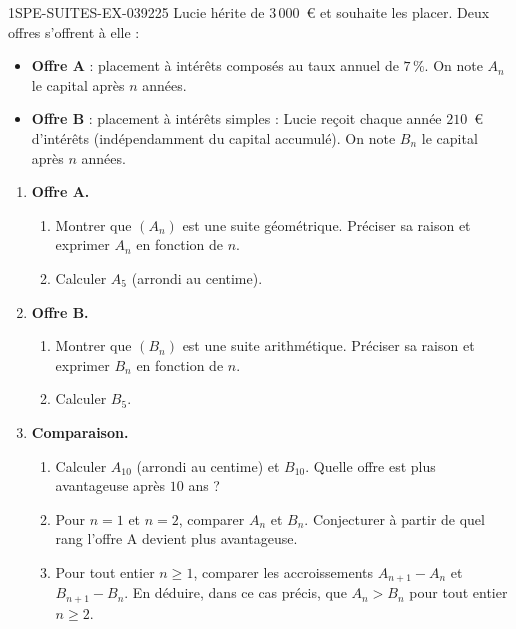 \begin{exercice}{1SPE-SUITES-EX-039}{2}{25}
Lucie hérite de $3\,000$~\euro{} et souhaite les placer. Deux offres s'offrent à elle :

\begin{itemize}
  \item \textbf{Offre A} : placement à intérêts composés au taux annuel de $7\,\%$. On note $A_n$ le capital après $n$ années.
  \item \textbf{Offre B} : placement à intérêts simples : Lucie reçoit chaque année $210$~\euro{} d'intérêts (indépendamment du capital accumulé). On note $B_n$ le capital après $n$ années.
\end{itemize}

\begin{enumerate}
  \item \textbf{Offre A.}
  \begin{enumerate}
    \item Montrer que $(A_n)$ est une suite géométrique. Préciser sa raison et exprimer $A_n$ en fonction de $n$.
    \item Calculer $A_5$ (arrondi au centime).
  \end{enumerate}

  \item \textbf{Offre B.}
  \begin{enumerate}
    \item Montrer que $(B_n)$ est une suite arithmétique. Préciser sa raison et exprimer $B_n$ en fonction de $n$.
    \item Calculer $B_5$.
  \end{enumerate}

  \item \textbf{Comparaison.}
  \begin{enumerate}
    \item Calculer $A_{10}$ (arrondi au centime) et $B_{10}$. Quelle offre est plus avantageuse après $10$ ans ?
    \item Pour $n = 1$ et $n = 2$, comparer $A_n$ et $B_n$. Conjecturer à partir de quel rang l'offre A devient plus avantageuse.
    \item Pour tout entier $n \geq 1$, comparer les accroissements $A_{n+1}-A_n$ et $B_{n+1}-B_n$. En déduire, dans ce cas précis, que $A_n>B_n$ pour tout entier $n \geq 2$.
  \end{enumerate}
\end{enumerate}
\end{exercice}
